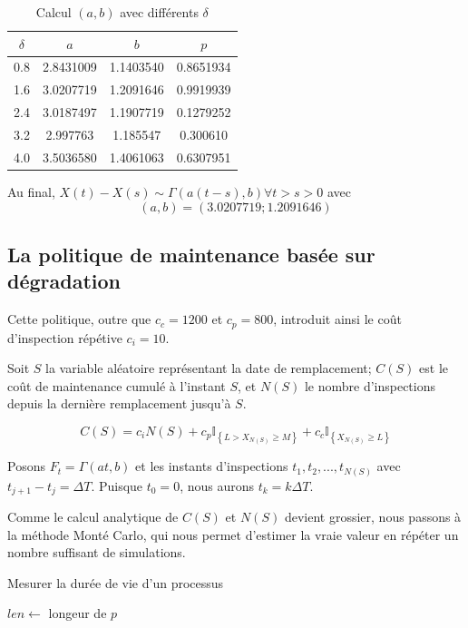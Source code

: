 \documentclass[10pt,a4paper]{article}
\begin{document}
\begin{table}[!h]
    \centering
    \begin{tabular}{|c|c|c|c|}
        \hline
        $\delta$ & $a$ & $b$ & $p$ \\
        \hline
        0.8 & 2.8431009 & 1.1403540 & 0.8651934\\
        1.6 & 3.0207719 & 1.2091646 & 0.9919939\\
        2.4 & 3.0187497 & 1.1907719 & 0.1279252\\
        3.2 & 2.997763 & 1.185547 & 0.300610\\
        4.0 & 3.5036580 & 1.4061063 & 0.6307951\\
        \hline
    \end{tabular}
    \caption{Calcul $(a,b)$ avec différents $\delta$}
\end{table}

Au final, $X(t) - X(s) \sim \Gamma(a(t-s),b) \forall t > s > 0$ avec $$(a,b) = (3.0207719;1.2091646)$$

\subsection{La politique de maintenance basée sur dégradation}

Cette politique, outre que $c_c=1200$ et $c_p=800$, introduit ainsi le coût d'inspection répétive $c_i = 10$.

Soit $S$ la variable aléatoire représentant la date de remplacement; $C(S)$ est le coût de maintenance cumulé à l’instant $S$, et $N(S)$ le nombre d'inspections depuis la dernière remplacement jusqu'à $S$.

\begin{equation}
    \label{c_s_de}
    C\left( S \right) = {c_i}N\left( S \right) + {c_p}{\mathbb{I}_{\left\{ {L > {X_{N\left( S \right)}} \geq M} \right\}}} + {c_c}{\mathbb{I}_{\left\{ {{X_{N\left( S \right)}} \geq L} \right\}}}
\end{equation}

Posons ${F_t} = \Gamma \left( {at,b} \right)$ et les instants d'inspections ${t_1},{t_2},...,{t_{N\left( S \right)}}$ avec ${t_{j + 1}} - {t_j} = \Delta T$. Puisque $t_0 = 0$, nous aurons ${t_k} = k\Delta T$.

Comme le calcul analytique de $C(S)$ et $N(S)$ devient grossier, nous passons à la méthode Monté Carlo, qui nous permet d'estimer la vraie valeur en répéter un nombre suffisant de simulations.

\begin{algorithm}[!h]
    \caption{Mesurer la durée de vie d'un processus}
    \label{algo:s}
    $len \leftarrow $ longeur de $p$\;
\end{algorithm}
\end{document}
